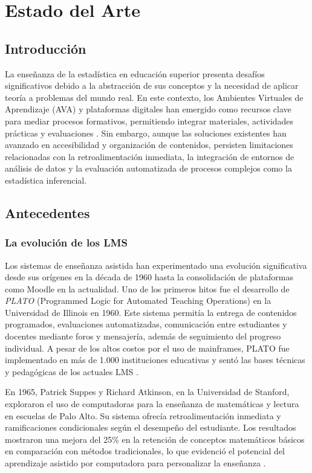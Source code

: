 \documentclass[letter,oneside,12pt,spanish]{report}
\begin{document}
\newpage


\chapter{Estado del Arte}

\section{Introducción}
La enseñanza de la estadística en educación superior presenta desafíos significativos debido a la abstracción de sus conceptos y la necesidad de aplicar teoría a problemas del mundo real. En este contexto, los Ambientes Virtuales de Aprendizaje (AVA) y plataformas digitales han emergido como recursos clave para mediar procesos formativos, permitiendo integrar materiales, actividades prácticas y evaluaciones \parencite{AlHaddad2024}. Sin embargo, aunque las soluciones existentes han avanzado en accesibilidad y organización de contenidos, persisten limitaciones relacionadas con la retroalimentación inmediata, la integración de entornos de análisis de datos y la evaluación automatizada de procesos complejos como la estadística inferencial.

\section{Antecedentes}

\subsection{La evolución de los LMS}
Los sistemas de enseñanza asistida han experimentado una evolución significativa desde sus orígenes en la década de 1960 hasta la consolidación de plataformas como Moodle en la actualidad. Uno de los primeros hitos fue el desarrollo de \textit{PLATO} (Programmed Logic for Automated Teaching Operations) en la Universidad de Illinois en 1960. Este sistema permitía la entrega de contenidos programados, evaluaciones automatizadas, comunicación entre estudiantes y docentes mediante foros y mensajería, además de seguimiento del progreso individual. A pesar de los altos costos por el uso de mainframes, PLATO fue implementado en más de 1.000 instituciones educativas y sentó las bases técnicas y pedagógicas de los actuales LMS \parencite{Woolley2016}.

En 1965, Patrick Suppes y Richard Atkinson, en la Universidad de Stanford, exploraron el uso de computadoras para la enseñanza de matemáticas y lectura en escuelas de Palo Alto. Su sistema ofrecía retroalimentación inmediata y ramificaciones condicionales según el desempeño del estudiante. Los resultados mostraron una mejora del 25\% en la retención de conceptos matemáticos básicos en comparación con métodos tradicionales, lo que evidenció el potencial del aprendizaje asistido por computadora para personalizar la enseñanza \parencite{Suppes1966}.
\end{document}

